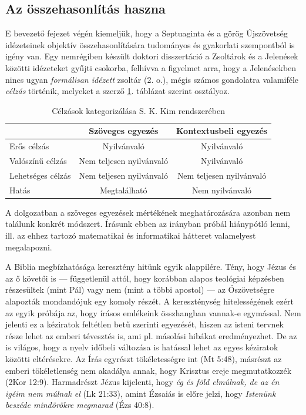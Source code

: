 \documentclass{article}
\begin{document}
\subsection{Az összehasonlítás haszna}

E bevezető fejezet végén kiemeljük, hogy a Septuaginta és a görög Újszövetség idézeteinek
objektív összehasonlítására tudományos és gyakorlati szempontból is igény van. Egy nemrégiben
készült doktori disszertáció \cite{SungKukKim} a Zsoltárok és a Jelenések közötti
idézeteket gyűjti csokorba, felhívva a figyelmet arra, hogy a Jelenésekben nincs ugyan
\textit{formálisan idézett} zsoltár (2. o.), mégis számos gondolatra valamiféle
\textit{célzás} történik, melyeket a szerző \ref{celzas}. táblázat szerint osztályoz.
\begin{table}
\begin{tabular}{l | c | c}
& Szöveges egyezés & Kontextusbeli egyezés \\
\hline
Erős célzás & Nyilvánvaló & Nyilvánvaló\\
Valószínű célzás & Nem teljesen nyilvánvaló & Nyilvánvaló\\
Lehetséges célzás & Nem teljesen nyilvánvaló & Nem teljesen nyilvánvaló\\
Hatás & Megtalálható & Nem nyilvánvaló
\end{tabular}
\caption{Célzások kategorizálása S. K. Kim rendszerében}
\label{celzas}
\end{table}
A dolgozatban a szöveges egyezések mértékének meghatározására azonban nem találunk konkrét módszert.
Írásunk ebben az irányban próbál hiánypótló lenni, ill. az ehhez tartozó matematikai
és informatikai hátteret valamelyest megalapozni.

A Biblia megbízhatósága keresztény hitünk egyik alappilére. Tény, hogy Jézus és az ő követői is ---
függetlenül attól, hogy korábban alapos teológiai képzésben részesültek (mint Pál) vagy nem
(mint a többi apostol) --- az Ószövetségre alapozták mondandójuk egy komoly részét.
A kereszténység hitelességének ezért az egyik próbája az, hogy írásos emlékeink összhangban
vannak-e egymással. Nem jelenti ez a kéziratok feltétlen betű szerinti egyezését, hiszen az isteni
tervnek része lehet az emberi tévesztés is, ami pl. másolási hibákat eredményezhet. De az is világos, hogy
a nyelv időbeli változása is hatással lehet az egyes kéziratok közötti eltérésekre. Az Írás
egyrészt tökéletességre int (Mt 5:48),
másrészt az emberi tökéletlenség nem akadálya annak, hogy Krisztus ereje megmutatkozzék
(2Kor 12:9). Harmadrészt Jézus kijelenti, hogy \textit{ég és föld elmúlnak, de az én igéim
nem múlnak el} (Lk 21:33), amint Ézsaiás is előre jelzi, hogy \textit{Istenünk beszéde
mindörökre megmarad} (Ézs 40:8).
\end{document}
